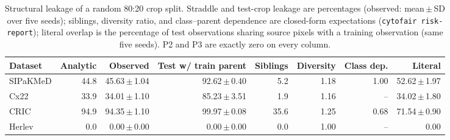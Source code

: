 \begin{table}[t]
\centering\footnotesize
\setlength{\tabcolsep}{4pt}
\caption{Structural leakage of a random 80:20 crop split. Straddle and test-crop leakage are percentages (observed: mean\,$\pm$\,SD over five seeds); siblings, diversity ratio, and class--parent dependence are closed-form expectations (\texttt{cytofair risk-report}); literal overlap is the percentage of test observations sharing source pixels with a training observation (same five seeds). P2 and P3 are exactly zero on every column.}
\label{tab:structure}
\begin{tabular}{lrrrrrrr}
\toprule
Dataset & Analytic & Observed & Test w/ train parent & Siblings & Diversity & Class dep. & Literal \\
\midrule
SIPaKMeD & 44.8 & 45.63\,$\pm$\,1.04 & 92.62\,$\pm$\,0.40 & 5.2 & 1.18 & 1.00 & 52.62\,$\pm$\,1.97 \\
Cx22 & 33.9 & 34.01\,$\pm$\,1.10 & 85.23\,$\pm$\,3.51 & 1.9 & 1.16 & -- & 34.02\,$\pm$\,1.80 \\
CRIC & 94.9 & 94.35\,$\pm$\,1.10 & 99.97\,$\pm$\,0.08 & 35.6 & 1.25 & 0.68 & 71.54\,$\pm$\,0.90 \\
Herlev & 0.0 & 0.00\,$\pm$\,0.00 & 0.00\,$\pm$\,0.00 & 0.0 & 1.00 & -- & 0.00 \\
\bottomrule
\end{tabular}
\end{table}
